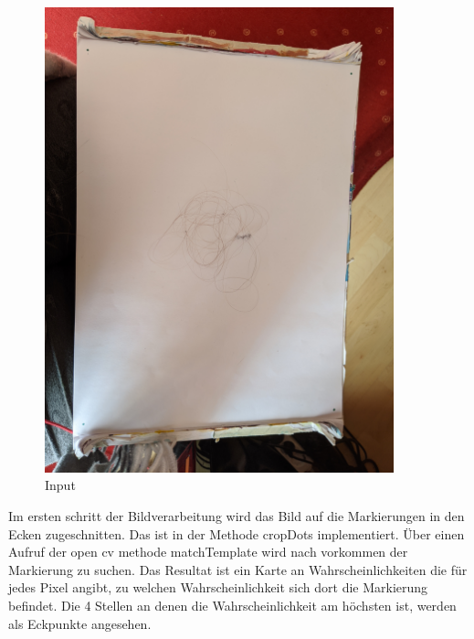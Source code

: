\documentclass[german,a4paper,12pt]{llncs}
\begin{document}
\begin{figure}
	\centering
	\includegraphics[width=0.9\textwidth]{fig64/00IMG_20200406_153354_12_g_15.jpg}
	\caption[]{Input}
	\label{img:input}
\end{figure}

Im ersten schritt der Bildverarbeitung wird das Bild auf die Markierungen in den Ecken zugeschnitten. Das ist in der Methode cropDots implementiert.
Über einen Aufruf der open cv methode matchTemplate wird nach vorkommen der Markierung zu suchen. Das Resultat ist ein Karte an Wahrscheinlichkeiten die für jedes Pixel angibt, zu welchen Wahrscheinlichkeit sich dort die Markierung befindet. Die 4 Stellen an denen die Wahrscheinlichkeit am höchsten ist, werden als Eckpunkte angesehen. 
\end{document}
